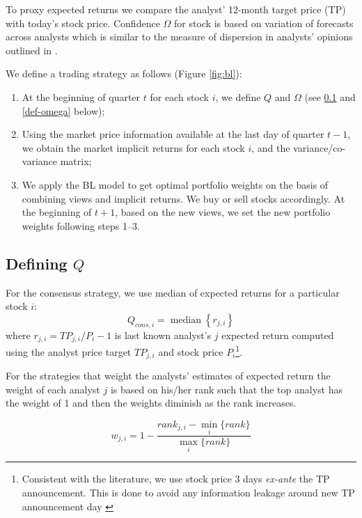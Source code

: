 \documentclass{article}\usepackage[]{graphicx}\usepackage[]{color}
\DeclareMathOperator*{\median}{median}
\begin{document}
To proxy expected returns we compare the analyst' 12-month target price (TP) with today's stock price. Confidence $\Omega$ for stock is based on variation  of forecasts across analysts which is similar to the measure of dispersion in analysts' opinions outlined in \cite{diether2002}.


We define a trading strategy as follows (Figure \ref{fig:bl}):
\begin{enumerate}
\item  At the beginning of quarter $t$ for each stock $i$,   we define $Q$ and $\Omega$ (see \ref{def-q} and \ref{def-omega} below);

\item Using the market price information available at the last day of quarter $t-1$, we obtain the market implicit returns for each stock $i$,  and the variance/co-variance matrix;

\item We apply the BL model to get  optimal portfolio weights on the basis of combining views and implicit returns. We  buy or sell stocks accordingly. At the beginning of $t+1$, based on the new views, we set the new portfolio weights following  steps 1--3.
\end{enumerate}

\subsection{Defining $Q$}
\label{def-q}

For the consensus strategy, we use median of expected returns for a particular stock $i$:
\begin{equation}
\label{consq}
Q_{cons,i}= \median \left\{r_{j,i}\right\}
\end{equation}
where $r_{j,i}=TP_{j,i}/P_{i}-1$  is last known analyst's $j$ expected return computed using the analyst price target $TP_{j,i}$ and stock price $P_{i}$\footnote{Consistent with the literature, we use stock price 3 days \emph{ex-ante} the TP announcement. This is done to avoid any information leakage around new TP announcement day \citep{bonini2010}}. 

For the strategies that weight the analysts' estimates of expected return the weight of each analyst $j$ is based on his/her rank such that the top analyst has the weight of 1 and then the weights diminish as the rank increases.


\begin{equation}
\label{eq:weight}
w_{j,i}=1-\frac{rank_{j,i}-\min_i{ \{rank \} }}{\max_i{\{rank \}}}
\end{equation}
\end{document}
